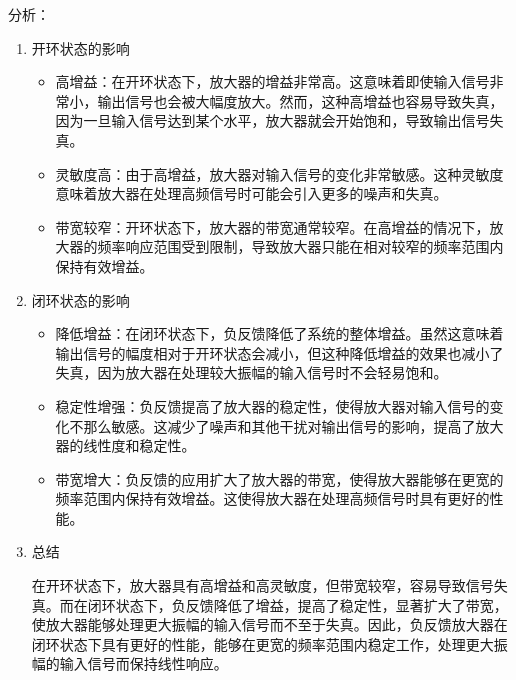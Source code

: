 \documentclass[dvipsnames, svgnames,a4paper,11pt]{article}
\begin{document}
\begin{enumerate}
\begin{enumerate}
							分析：
									\begin{enumerate}
										\item 开环状态的影响
											
											\begin{itemize}
												\item 高增益：在开环状态下，放大器的增益非常高。这意味着即使输入信号非常小，输出信号也会被大幅度放大。然而，这种高增益也容易导致失真，因为一旦输入信号达到某个水平，放大器就会开始饱和，导致输出信号失真。
												\item 灵敏度高：由于高增益，放大器对输入信号的变化非常敏感。这种灵敏度意味着放大器在处理高频信号时可能会引入更多的噪声和失真。
												\item 带宽较窄：开环状态下，放大器的带宽通常较窄。在高增益的情况下，放大器的频率响应范围受到限制，导致放大器只能在相对较窄的频率范围内保持有效增益。
											\end{itemize}
										
										\item 闭环状态的影响
										
											\begin{itemize}
												\item 降低增益：在闭环状态下，负反馈降低了系统的整体增益。虽然这意味着输出信号的幅度相对于开环状态会减小，但这种降低增益的效果也减小了失真，因为放大器在处理较大振幅的输入信号时不会轻易饱和。
												\item 稳定性增强：负反馈提高了放大器的稳定性，使得放大器对输入信号的变化不那么敏感。这减少了噪声和其他干扰对输出信号的影响，提高了放大器的线性度和稳定性。
												\item 带宽增大：负反馈的应用扩大了放大器的带宽，使得放大器能够在更宽的频率范围内保持有效增益。这使得放大器在处理高频信号时具有更好的性能。
											\end{itemize}
								
										\item 总结
										
											在开环状态下，放大器具有高增益和高灵敏度，但带宽较窄，容易导致信号失真。而在闭环状态下，负反馈降低了增益，提高了稳定性，显著扩大了带宽，使放大器能够处理更大振幅的输入信号而不至于失真。因此，负反馈放大器在闭环状态下具有更好的性能，能够在更宽的频率范围内稳定工作，处理更大振幅的输入信号而保持线性响应。
									\end{enumerate}
							
					\end{enumerate}
					

\end{enumerate}
\end{document}
